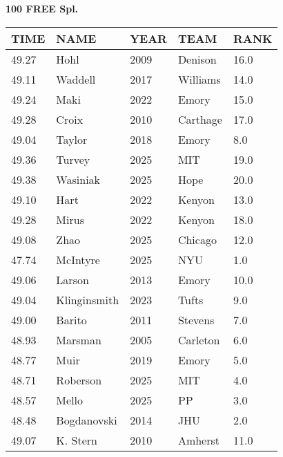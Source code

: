 \begin{center}
\begin{minipage}[t]{0.7\textwidth}
\centering
\textbf{100 FREE Spl.}\\[0.05cm]
\begin{tabular}{@{}p{1.8cm}p{2.8cm}p{1.2cm}p{1.4cm}p{0.8cm}@{}}
\hline
\textbf{TIME} & \textbf{NAME} & \textbf{YEAR} & \textbf{TEAM} & \textbf{RANK} \\
\hline
49.27 & Hohl & 2009 & Denison & 16.0 \\
49.11 & Waddell & 2017 & Williams & 14.0 \\
49.24 & Maki & 2022 & Emory & 15.0 \\
49.28 & Croix & 2010 & Carthage & 17.0 \\
49.04 & Taylor & 2018 & Emory & 8.0 \\
49.36 & Turvey & 2025 & MIT & 19.0 \\
49.38 & Wasiniak & 2025 & Hope & 20.0 \\
49.10 & Hart & 2022 & Kenyon & 13.0 \\
49.28 & Mirus & 2022 & Kenyon & 18.0 \\
49.08 & Zhao & 2025 & Chicago & 12.0 \\
47.74 & McIntyre & 2025 & NYU & 1.0 \\
49.06 & Larson & 2013 & Emory & 10.0 \\
49.04 & Klinginsmith & 2023 & Tufts & 9.0 \\
49.00 & Barito & 2011 & Stevens & 7.0 \\
48.93 & Marsman & 2005 & Carleton & 6.0 \\
48.77 & Muir & 2019 & Emory & 5.0 \\
48.71 & Roberson & 2025 & MIT & 4.0 \\
48.57 & Mello & 2025 & PP & 3.0 \\
48.48 & Bogdanovski & 2014 & JHU & 2.0 \\
49.07 & K. Stern & 2010 & Amherst & 11.0 \\
\hline
\end{tabular}
\end{minipage}
\end{center}

\vspace{0.4cm}

